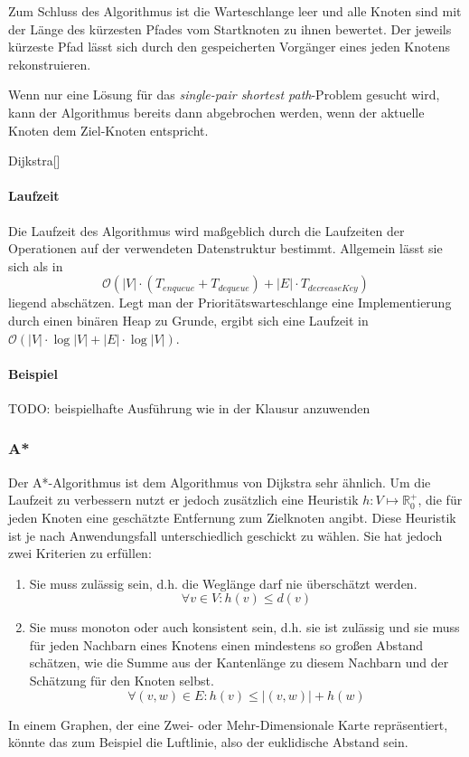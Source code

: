 Zum Schluss des Algorithmus ist die Warteschlange leer und alle Knoten sind mit der Länge des kürzesten Pfades vom Startknoten zu ihnen bewertet.
Der jeweils kürzeste Pfad lässt sich durch den gespeicherten Vorgänger eines jeden Knotens rekonstruieren.

Wenn nur eine Lösung für das \textit{single-pair shortest path}-Problem gesucht wird,
kann der Algorithmus bereits dann abgebrochen werden, wenn der aktuelle Knoten dem Ziel-Knoten entspricht.

\begin{algorithm}{Dijkstra}[]{
	\qinput{}
	\qoutput{}
}
\end{algorithm}

\paragraph{Laufzeit}
Die Laufzeit des Algorithmus wird maßgeblich durch die Laufzeiten der Operationen auf der verwendeten Datenstruktur bestimmt.
Allgemein lässt sie sich als in
$$\mathcal{O}(|V| \cdot (T_{enqueue} + T_{dequeue}) + |E| \cdot T_{decreaseKey})$$
liegend abschätzen.
Legt man der Prioritätswarteschlange eine Implementierung durch einen binären Heap zu Grunde,
ergibt sich eine Laufzeit in $\mathcal{O}(|V| \cdot \log |V| + |E| \cdot \log |V|)$.

\paragraph{Beispiel}
TODO: beispielhafte Ausführung wie in der Klausur anzuwenden

\subsubsection{A*}
\label{subsubsec:AStern}

Der A*-Algorithmus ist dem Algorithmus von Dijkstra sehr ähnlich.
Um die Laufzeit zu verbessern nutzt er jedoch zusätzlich eine Heuristik $h: V \mapsto \mathbb{R}_0^+$,
die für jeden Knoten eine geschätzte Entfernung zum Zielknoten angibt.
Diese Heuristik ist je nach Anwendungsfall unterschiedlich geschickt zu wählen.
Sie hat jedoch zwei Kriterien zu erfüllen:
\begin{enumerate}
\item Sie muss zulässig sein, d.h. die Weglänge darf nie überschätzt werden.
$$\forall v \in V: h(v) \leq d(v)$$
\item Sie muss monoton oder auch konsistent sein,
d.h. sie ist zulässig und sie muss für jeden Nachbarn eines Knotens einen mindestens so großen Abstand schätzen,
wie die Summe aus der Kantenlänge zu diesem Nachbarn und der Schätzung für den Knoten selbst.
$$\forall (v, w) \in E: h(v) \leq |(v, w)| + h(w)$$
\end{enumerate}
In einem Graphen, der eine Zwei- oder Mehr-Dimensionale Karte repräsentiert, könnte das zum Beispiel die Luftlinie, also der euklidische Abstand sein. \nocite{wiki:astar}


